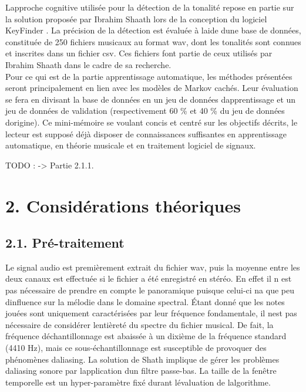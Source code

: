 \documentclass[letterpaper]{article}
\begin{document}
L\textquotesingle approche cognitive utilisée pour la détection de la tonalité repose en partie
sur la solution proposée par Ibrahim Sha\textquotesingle ath lors 
de la conception du logiciel KeyFinder \citep{IS}. La précision de la détection est évaluée 
à l\textquotesingle aide d\textquotesingle une base 
de données, constituée de 250 fichiers musicaux au format wav, dont les tonalités sont connues
et inscrites dans un fichier csv. Ces fichiers font partie de ceux utilisés par 
Ibrahim Sha\textquotesingle ath dans le cadre de sa recherche.\\

Pour ce qui est de la partie apprentissage automatique, les méthodes présentées seront principalement
en lien avec les modèles de Markov cachés. Leur évaluation se fera en divisant la base de données en
un jeu de données d\textquotesingle apprentissage et un jeu de données de validation (respectivement
60 \% et 40 \% du jeu de données d\textquotesingle origine). Ce mini-mémoire se voulant concis et 
centré sur les objectifs décrits, le lecteur est supposé déjà disposer de connaissances suffisantes en 
apprentissage automatique, en théorie musicale et en traitement logiciel de signaux.

TODO : \citep{SP} \citep{AT} -> Partie 2.1.1.

\section*{2. Considérations théoriques}

\subsection*{2.1. Pré-traitement}

Le signal audio est premièrement extrait du fichier wav, puis la moyenne entre les 
deux canaux est effectuée si le fichier a été enregistré en stéréo. En effet il n\textquotesingle
est pas nécessaire de prendre en compte le panoramique puisque celui-ci n\textquotesingle a que 
peu d\textquotesingle influence sur la mélodie dans le domaine spectral. 
Étant donné que les notes jouées sont uniquement caractérisées par leur fréquence fondamentale,
il n\textquotesingle est pas nécessaire de considérer l\textquotesingle entièreté du spectre
du fichier musical. De fait, la fréquence d\textquotesingle échantillonnage est abaissée à un dixième 
de la fréquence standard (4410 Hz), mais ce sous-échantillonnage est susceptible de provoquer des
phénomènes d\textquotesingle aliasing. La solution de Sh\textquotesingle ath implique de
gérer les problèmes d\textquotesingle aliasing sonore par l\textquotesingle application 
d\textquotesingle un filtre passe-bas. La taille de la fenêtre temporelle est un hyper-paramètre fixé durant
l\textquotesingle évaluation de l\textquotesingle algorithme. \citep{IS}
\end{document}
